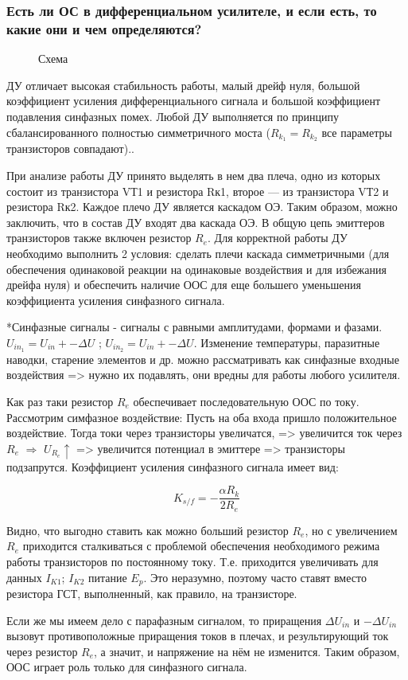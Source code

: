 \subsubsection{Есть ли ОС в дифференциальном усилителе, и если есть, то какие они и чем определяются?}

\begin{center}
	\begin{figure}[h!]
		\caption{Схема}
	\end{figure}
\end{center} 
ДУ отличает высокая стабильность работы, малый дрейф нуля, большой коэффициент усиления дифференциального сигнала и большой коэффициент подавления синфазных помех.
Любой ДУ выполняется по принципу сбалансированного полностью симметричного моста ($R_{k_1} = R_{k_2}$ все параметры транзисторов совпадают).. 

При анализе работы ДУ принято выделять в нем два плеча, одно из которых состоит из транзистора VТ1 и резистора Rк1, второе  — из транзистора VТ2 и резистора Rк2. Каждое плечо ДУ является каскадом ОЭ. Таким образом, можно заключить, что в состав ДУ входят два каскада ОЭ. В общую цепь эмиттеров транзисторов также включен резистор $R_e$. Для корректной работы ДУ необходимо выполнить 2 условия: сделать плечи каскада симметричными (для обеспечения одинаковой реакции на одинаковые воздействия и для избежания дрейфа нуля) и обеспечить наличие ООС для еще большего уменьшения коэффициента усиления синфазного сигнала.

*Синфазные сигналы  - сигналы с равными амплитудами, формами и фазами. $U_{in_1} = U_{in} +- \Delta U$ ; $U_{in_2} = U_{in} +- \Delta U$. Изменение температуры, паразитные наводки, старение элементов и др. можно рассматривать как синфазные входные воздействия => нужно их подавлять, они вредны для работы любого усилителя.

Как раз таки резистор $R_e$ обеспечивает последовательную ООС по току. Рассмотрим симфазное воздействие: Пусть на оба входа пришло положительное воздействие. Тогда токи через транзисторы увеличатся, => увеличится ток через $R_e$ $\Rightarrow$ $U_{R_e} \uparrow$ => увеличится потенциал в эмиттере => транзисторы подзапрутся. Коэффициент усиления синфазного сигнала имеет вид:

$$
K_{s/f} = -\frac{\alpha R_k}{2R_e}
$$

Видно, что выгодно ставить как можно больший резистор $R_e$, но с увеличением $R_e$ приходится сталкиваться с проблемой обеспечения необходимого режима работы транзисторов по постоянному току. Т.е. приходится увеличивать для данных $I_{K1}$; $I_{K2}$ питание $E_p$. Это неразумно, поэтому часто ставят вместо резистора ГСТ, выполненный, как правило, на транзисторе.

Если же мы имеем дело с парафазным сигналом, то приращения $\Delta U_{in}$ и $-\Delta U_{in}$ вызовут противоположные приращения токов в плечах, и результирующий ток через резистор $R_e$, а значит, и напряжение на нём не изменится. Таким образом, ООС играет роль только для синфазного сигнала. 

\pagebreak